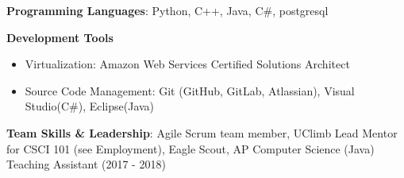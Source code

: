 \vspace{-2.0mm}


\begin{cventries}
\vspace{-5mm}
  \cventry
    {}
    {}
    {}
    {}
    {
      \begin{cvitems}
        \item {\textbf{Programming Languages}: Python, C++, Java, C\#,
    postgresql}
        \item {\textbf{Development Tools}}
        \begin{itemize}
        \item {Virtualization: Amazon Web Services
            Certified Solutions Architect}
        \item {Source Code Management: Git (GitHub, GitLab, Atlassian),
            Visual Studio(C\#), Eclipse(Java)}
        \end {itemize}
        \item {\textbf{Team Skills \& Leadership}: Agile Scrum team
            member, UClimb Lead Mentor for CSCI 101 (see Employment),
    Eagle Scout, AP Computer Science (Java) Teaching Assistant (2017 -
    2018)}
      \end{cvitems}
    }
\end{cventries}
